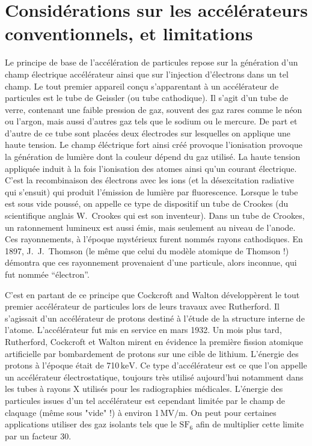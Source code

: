 \documentclass[a4paper]{book}
\begin{document}
\section{Considérations sur les accélérateurs conventionnels, et limitations}

Le principe de base de l'accélération de particules repose sur la génération d'un champ électrique accélérateur ainsi que sur l'injection d'électrons dans un tel champ. Le tout premier appareil conçu s'apparentant à un accélérateur de particules est le tube de Geissler (ou tube cathodique). Il s'agit d'un tube de verre, contenant une faible pression de gaz, souvent des gaz rares comme le néon ou l'argon, mais aussi d'autres gaz tels que le sodium ou le mercure. De part et d'autre de ce tube sont placées deux électrodes sur lesquelles on applique une haute tension. Le champ éléctrique fort ainsi créé provoque l'ionisation provoque la génération de lumière dont la couleur dépend du gaz utilisé. La haute tension appliquée induit à la fois l'ionisation des atomes ainsi qu'un courant électrique. C'est la recombinaison des électrons avec les ions (et la désexcitation radiative qui s'ensuit) qui produit l'émission de lumière par fluorescence. Lorsque le tube est sous vide poussé, on appelle ce type de dispositif un tube de Crookes (du scientifique anglais W.~Crookes qui est son inventeur). Dans un tube de Crookes, un ratonnement lumineux est aussi émis, mais seulement au niveau de l'anode. Ces rayonnements, à l'époque mystérieux furent nommés rayons cathodiques. En 1897, J.~J.~Thomson (le même que celui du modèle atomique de Thomson !) démontra que ces rayonnement provenaient d'une particule, alors inconnue, qui fut nommée ``électron''. 

C'est en partant de ce principe que Cockcroft and Walton développèrent le tout premier accélérateur de particules lors de leurs travaux avec Rutherford. Il s'agissait d'un accélérateur de protons destiné à l'étude de la structure interne de l'atome. L'accélérateur fut mis en service en mars 1932. Un mois plus tard, Rutherford, Cockcroft et Walton mirent en évidence la première fission atomique artificielle par bombardement de protons sur une cible de lithium. L'énergie des protons à l'époque était de 710$\,\mathrm{keV}$. Ce type d'accélérateur est ce que l'on appelle un accélérateur électrostatique, toujours très utilisé aujourd'hui notamment dans les tubes à rayons X utilisés pour les radiographies médicales. L'énergie des particules issues d'un tel accélérateur est cependant limitée par le champ de claquage (même sous "vide" !) à environ 1$\,\mathrm{MV/m}$. On peut pour certaines applications utiliser des gaz isolants tels que le $\mathrm{SF}_6$ afin de multiplier cette limite par un facteur 30.
\end{document}
